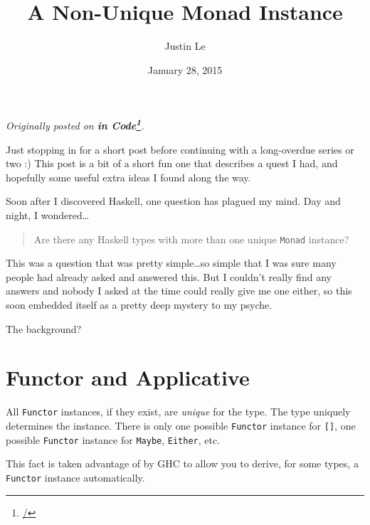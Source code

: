 \documentclass[]{article}
\title{A Non-Unique Monad Instance}
\author{Justin Le}
\date{January 28, 2015}
\renewcommand{\href}[2]{#2\footnote{\url{#1}}}
\begin{document}
\maketitle

\emph{Originally posted on \textbf{\href{/}{in Code}}.}

Just stopping in for a short post before continuing with a long-overdue
series or two :) This post is a bit of a short fun one that describes a
quest I had, and hopefully some useful extra ideas I found along the
way.

Soon after I discovered Haskell, one question has plagued my mind. Day
and night, I wondered\ldots{}

\begin{quote}
Are there any Haskell types with more than one unique \texttt{Monad}
instance?
\end{quote}

This was a question that was pretty simple\ldots{}so simple that I was
sure many people had already asked and answered this. But I couldn't
really find any answers and nobody I asked at the time could really give
me one either, so this soon embedded itself as a pretty deep mystery to
my psyche.

The background?

\section{Functor and Applicative}\label{functor-and-applicative}

All \texttt{Functor} instances, if they exist, are \emph{unique} for the
type. The type uniquely determines the instance. There is only one
possible \texttt{Functor} instance for \texttt{{[}{]}}, one possible
\texttt{Functor} instance for \texttt{Maybe}, \texttt{Either}, etc.

This fact is taken advantage of by GHC to allow you to derive, for some
types, a \texttt{Functor} instance automatically.
\end{document}

